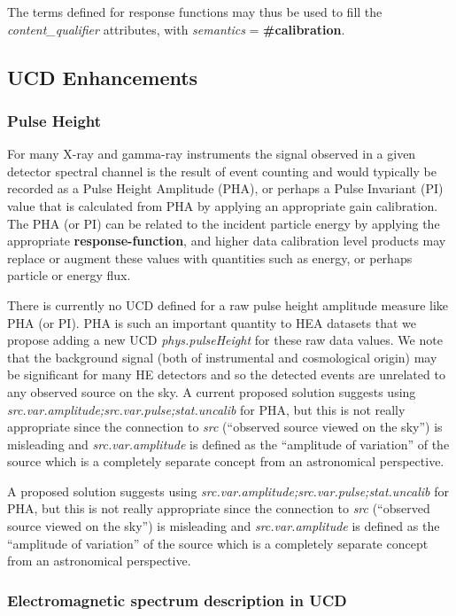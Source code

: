 \documentclass[11pt,a4paper]{ivoa}
\begin{document}
The terms defined for response functions may thus be used to fill the {\em content\_qualifier} attributes, with {\em semantics} = {\bf \#calibration}.


\subsection{UCD Enhancements}\label{sec:UCDs}

\subsubsection{Pulse Height}

For many X-ray and gamma-ray instruments the signal observed in a given detector spectral channel is the result of event counting and would typically be recorded as a Pulse Height Amplitude (PHA), or perhaps a Pulse Invariant (PI) value that is calculated from PHA by applying an appropriate gain calibration.  The PHA (or PI) can be related to the incident particle energy by applying the appropriate {\bf response-function}, and higher data calibration level products may replace or augment these values with quantities such as energy, or perhaps particle or energy flux.

There is currently no UCD defined for a raw pulse height amplitude measure like PHA (or PI). PHA is such an important quantity to \gls{HEA} datasets that we propose adding a new UCD {\em phys.pulseHeight\/} for these raw data values.  We note that the background signal (both of instrumental and cosmological origin) may be significant for many \gls{HE} detectors and so the detected events are unrelated to any observed source on the sky.  A current proposed solution suggests using {\em src.var.amplitude;src.var.pulse;stat.uncalib\/} for PHA, but this is not really appropriate since the connection to {\em src\/} (``observed source viewed on the sky'') is misleading and {\em src.var.amplitude\/} is defined as the ``amplitude of variation'' of the source which is a completely separate concept from an astronomical perspective.

A proposed solution suggests using {\em src.var.amplitude;src.var.pulse;stat.uncalib\/} for PHA, but this is not really appropriate since the connection to {\em src\/} (``observed source viewed on the sky'') is misleading and {\em src.var.amplitude\/} is defined as the ``amplitude of variation'' of the source which is a completely separate concept from an astronomical perspective.

\subsubsection{Electromagnetic spectrum description in UCD}
\end{document}
